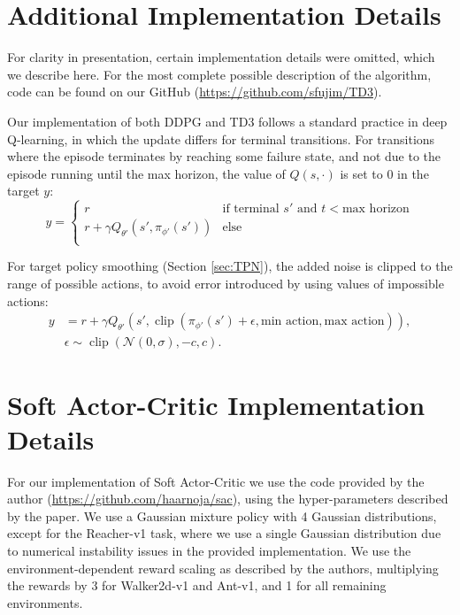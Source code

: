 \documentclass{article}
\newcommand{\e}{\epsilon}
\newcommand{\y}{\gamma}
\newcommand{\s}{\sigma}
\newcommand{\N}{\mathcal{N}}
\DeclareMathOperator*{\clip}{clip}
\begin{document}
\section{Additional Implementation Details}

For clarity in presentation, certain implementation details were omitted, which we describe here. For the most complete possible description of the algorithm, code can be found on our GitHub (\url{https://github.com/sfujim/TD3}). 

Our implementation of both DDPG and TD3 follows a standard practice in deep Q-learning, in which the update differs for terminal transitions. For transitions where the episode terminates by reaching some failure state, and not due to the episode running until the max horizon, the value of $Q(s, \cdot)$ is set to $0$ in the target $y$: 
$$
y = 
  \begin{cases}
   r  & \text{if terminal } s' \text{ and } t < \text{max horizon} \\
   r + \y Q_{\theta'}(s',\pi_{\phi'}(s')) & \text{else} \\
  \end{cases}
$$

For target policy smoothing (Section \ref{sec:TPN}), the added noise is clipped to the range of possible actions, to avoid error introduced by using values of impossible actions: 
$$
\begin{aligned}
y &= r + \y Q_{\theta'}(s', \clip (\pi_{\phi'}(s') + \e, \text{min action}, \text{max action})), \\
& \e \sim \clip(\N(0, \s), -c, c).
\end{aligned}
$$

%

\section{Soft Actor-Critic Implementation Details}

For our implementation of Soft Actor-Critic \cite{haarnoja2018soft} we use the code provided by the author (\url{https://github.com/haarnoja/sac}), using the hyper-parameters described by the paper. We use a Gaussian mixture policy with 4 Gaussian distributions, except for the Reacher-v1 task, where we use a single Gaussian distribution due to numerical instability issues in the provided implementation. We use the environment-dependent reward scaling as described by the authors, multiplying the rewards by 3 for Walker2d-v1 and Ant-v1, and 1 for all remaining environments. 
\end{document}

